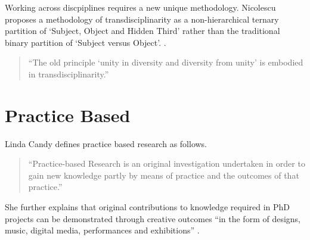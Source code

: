 Working across discpiplines requires a new unique methodology. Nicolescu proposes a methodology of transdisciplinarity as a non-hierarchical ternary partition of `Subject, Object and Hidden Third' rather than the traditional binary partition of `Subject versus Object'. \autocite{Nicolescu2010}.


\begin{quote}
  ``The old principle `unity in diversity and diversity from unity' is embodied in transdisciplinarity.'' \autocite{Nicolescu2010}
\end{quote}


\section{Practice Based}

Linda Candy defines practice based research as follows.

\begin{quote}
  ``Practice-based Research is an original investigation undertaken in order to gain new knowledge partly by means of practice and the outcomes of that practice.'' \autocite{Candy2006}
\end{quote}

She further explains that original contributions to knowledge required in PhD projects can be demonstrated through creative outcomes ``in the form of designs, music, digital media, performances and exhibitions'' \autocite{Candy2006}.


